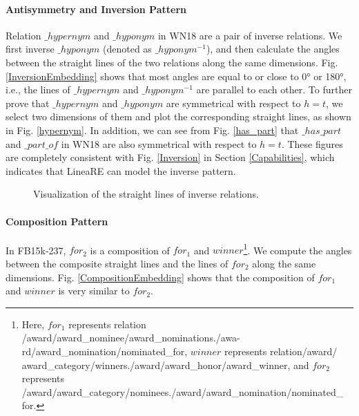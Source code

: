 \documentclass[conference]{IEEEtran}
\begin{document}
\paragraph{Antisymmetry and Inversion Pattern}
Relation $\_hypernym$ and $\_hyponym$ in WN18 are a pair of inverse relations. We first inverse $\_hyponym$ (denoted as $\_hyponym^{-1}$), and then calculate the angles between the straight lines of the two relations along the same dimensions. Fig. \ref{InversionEmbedding} shows that most angles are equal to or close to 0° or 180°, i.e., the lines of $\_hypernym$ and $\_hyponym^{-1}$ are parallel to each other. To further prove that $\_hypernym$ and $\_hyponym$ are symmetrical with respect to $h=t$, we select two dimensions of them and plot the corresponding straight lines, as shown in Fig. \ref{hypernym}. In addition, we can see from Fig. \ref{has_part} that $\_has\_part$ and $\_part\_of$ in WN18 are also symmetrical with respect to $h=t$. These figures are completely consistent with Fig. \ref{Inversion} in Section \ref{Capabilities}, which indicates that LineaRE can model the inverse pattern.
\begin{figure}[t]
	\centering
	\caption{
		Visualization of the straight lines of inverse relations.
	}
	\label{InversionLine}
\end{figure}

\paragraph{Composition Pattern}
In FB15k-237, $for_2$ is a composition of $for_1$ and $winner$\footnote{
	Here, $for_1$ represents relation /award/award\_nominee/award\_nominations./awa-
	rd/award\_nomination/nominated\_for, $winner$ represents relation/award/ award\_category/winners./award/award\_honor/award\_winner, and $for_2$ represents /award/award\_category/nominees./award/award\_nomination/nominated\_ for.
}. We compute the angles between the composite straight lines and the lines of $for_2$ along the same dimensions. Fig. \ref{CompositionEmbedding} shows that the composition of $for_1$ and $winner$ is very similar to $for_2$.
\end{document}
